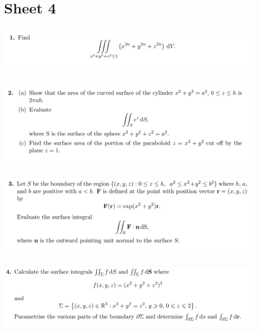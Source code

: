 \documentclass[12pt]{article}
\begin{document}
\newpage
\section{Sheet 4}

\subsection{}
\begin{mdframed}
  \includegraphics[width=400pt]{img/oxford-prelims-M5-multivariable-calc-4-1.png}
\end{mdframed}

\subsection{}
\begin{mdframed}
  \includegraphics[width=400pt]{img/oxford-prelims-M5-multivariable-calc-4-2.png}
\end{mdframed}

\subsection{}
\begin{mdframed}
  \includegraphics[width=400pt]{img/oxford-prelims-M5-multivariable-calc-4-3.png}
\end{mdframed}

\subsection{}
\begin{mdframed}
  \includegraphics[width=400pt]{img/oxford-prelims-M5-multivariable-calc-4-4.png}
\end{mdframed}
\end{document}
